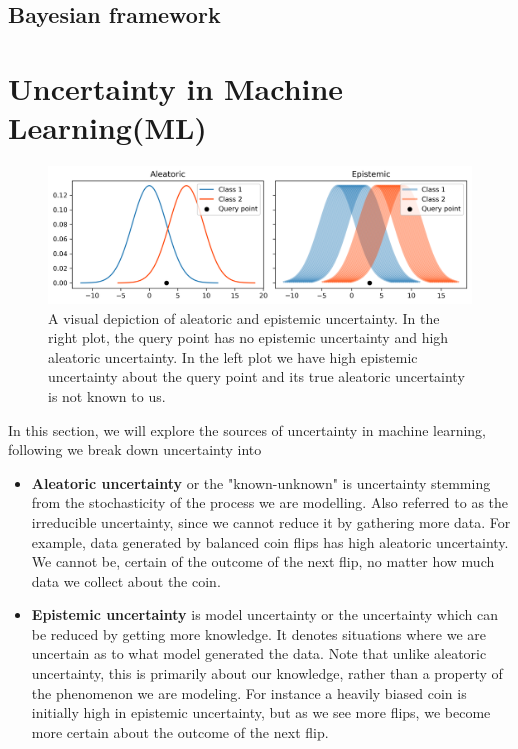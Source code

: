 \documentclass[../main.tex]{subfiles}
\begin{document}
\subsection{Bayesian framework}



\section{Uncertainty in Machine Learning(ML)}

\begin{figure}
    \centering
    \includegraphics[width=1\textwidth]{Background/aleatoric_epistemic.png}
    \caption[Aleatoric vs. epistemic uncertainty]{A visual depiction of aleatoric and epistemic uncertainty. In the right plot, the query point has no epistemic uncertainty and high aleatoric uncertainty. In the left plot we have high epistemic uncertainty about the query point and its true aleatoric uncertainty is not known to us.}
    \label{fig:aleatoric_vs_epistemic}
\end{figure}

In this section, we will explore the sources of uncertainty in machine learning, following \citet{der2009aleatory} we break down uncertainty into

\begin{itemize}
    \item \textbf{Aleatoric uncertainty} or the "known-unknown" is uncertainty stemming from the stochasticity of the process we are modelling. Also referred to as the irreducible uncertainty, since we cannot reduce it by gathering more data. For example, data generated by balanced coin flips has high aleatoric uncertainty. We cannot be, certain of the outcome of the next flip, no matter how much data we collect about the coin. 

    \item \textbf{Epistemic uncertainty} is model uncertainty or the uncertainty which can be reduced by getting more knowledge. It denotes situations where we are uncertain as to what model generated the data.
    Note that unlike aleatoric uncertainty, this is primarily about our knowledge, rather than a property of the phenomenon we are modeling. For instance a heavily biased coin is initially high in epistemic uncertainty, but as we see more flips, we become more certain about the outcome of the next flip.
\end{itemize}
\end{document}
